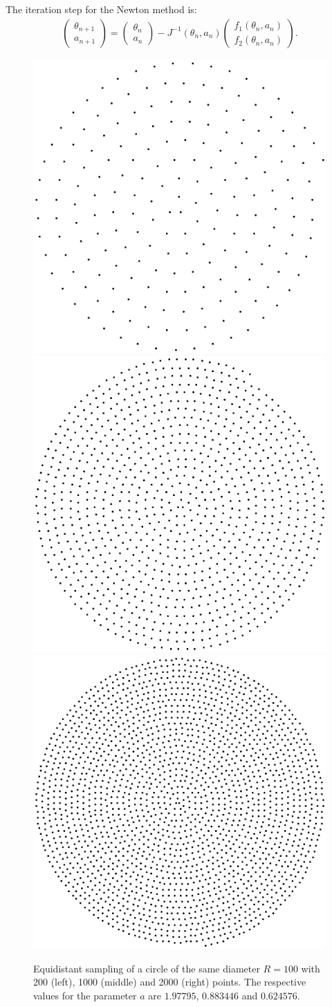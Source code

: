 \documentclass[twocolumn,DIV18]{scrartcl}
\renewcommand{\(}{\left(}
\renewcommand{\)}{\right)}
\begin{document}
The iteration step for the Newton method is:
\begin{align}
  \begin{pmatrix}\theta_{n+1}\\a_{n+1}\end{pmatrix}=
  \begin{pmatrix}\theta_n\\a_n\end{pmatrix}
  -J^{-1}(\theta_n,a_n)
  \begin{pmatrix}f_1(\theta_n,a_n)\\f_2(\theta_n,a_n)\end{pmatrix}.
\end{align}
\begin{figure}[h]
  \begin{center}
    \includegraphics[width=.3\columnwidth]{200}
    \includegraphics[width=.3\columnwidth]{1000}
    \includegraphics[width=.3\columnwidth]{2000}
  \end{center}
  \caption{Equidistant sampling of a circle of the same diameter
    $R=100$ with 200 (left), 1000 (middle) and 2000 (right)
    points. The respective values for the parameter $a$ are $1.97795$,
    $0.883446$ and $0.624576$. }
\end{figure}
\end{document}
